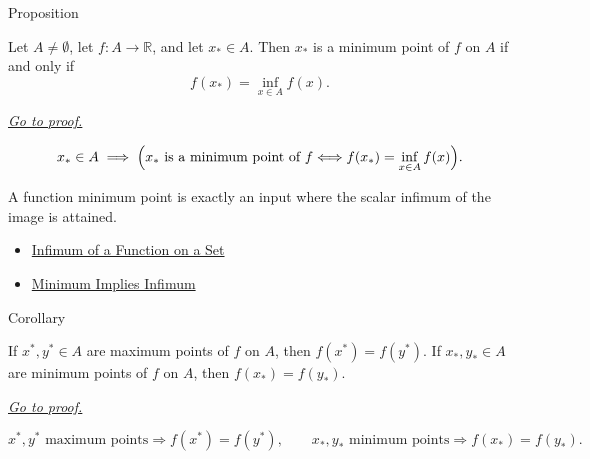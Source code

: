 \begin{propositionbox}{Proposition}
\begin{proposition}
\label{prop:minimum-point-characterized-by-infimum}
Let \(A\neq\emptyset\), let \(f:A\to\mathbb{R}\), and let \(x_*\in A\).
Then \(x_*\) is a minimum point of \(f\) on \(A\) if and only if
\[
  f(x_*)=\inf_{x\in A} f(x).
\]

\smallskip\noindent
\hyperref[prf:minimum-point-characterized-by-infimum]{\textit{Go to proof.}}
\end{proposition}
\end{propositionbox}

\begin{remark*}
\[
  x_*\in A
  \;\Longrightarrow\;
  \Bigl(x_*\text{ is a minimum point of }f
  \Longleftrightarrow f(x_*)=\inf_{x\in A}f(x)\Bigr).
\]
\end{remark*}

\begin{remark*}[Interpretation]
A function minimum point is exactly an input where the scalar infimum of the
image is attained.
\end{remark*}

\begin{dependencies}
\begin{itemize}
  \item \hyperref[def:function-infimum-on-set]{Infimum of a Function on a Set}
  \item \hyperref[prop:minimum-implies-infimum]{Minimum Implies Infimum}
\end{itemize}
\end{dependencies}

\begin{corollarybox}{Corollary}
\begin{corollary}
\label{cor:function-extremum-values-are-unique}
If \(x^*,y^*\in A\) are maximum points of \(f\) on \(A\), then
\(f(x^*)=f(y^*)\).  If \(x_*,y_*\in A\) are minimum points of \(f\) on
\(A\), then \(f(x_*)=f(y_*)\).

\smallskip\noindent
\hyperref[prf:function-extremum-values-are-unique]{\textit{Go to proof.}}
\end{corollary}
\end{corollarybox}

\begin{remark*}
\[
  x^*,y^*\text{ maximum points}\Rightarrow f(x^*)=f(y^*),
  \qquad
  x_*,y_*\text{ minimum points}\Rightarrow f(x_*)=f(y_*).
\]
\end{remark*}

